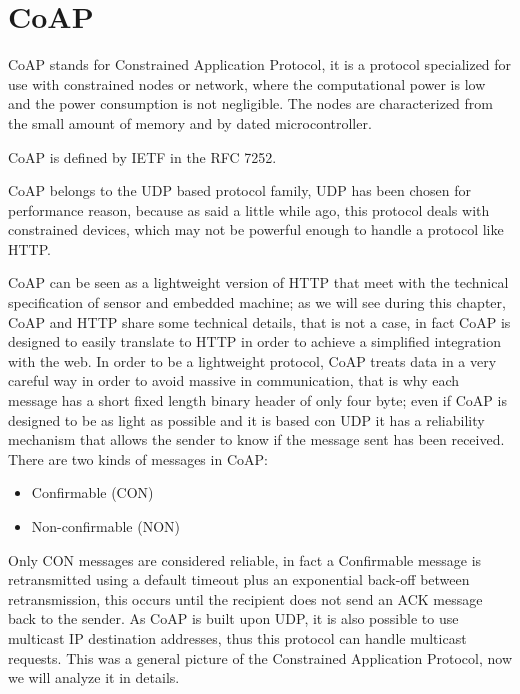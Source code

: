 
	\section{CoAP}
	CoAP stands for Constrained Application Protocol, it is a protocol specialized for use with constrained nodes or network, where the computational power is low and the power consumption is not negligible.\newline
	The nodes are characterized from the small amount of memory and by dated microcontroller.\newline
	
	CoAP is defined by IETF in the RFC 7252.\newline

	CoAP belongs to the UDP based protocol family, UDP has been chosen for performance reason, because as said a little while ago, this protocol deals with constrained devices, which may not be powerful enough to handle a protocol like HTTP.\newline
	
	CoAP can be seen as a lightweight version of HTTP that meet with the technical specification of sensor and embedded machine; as we will see during this chapter, CoAP and HTTP share some technical details, that is not a case, in fact CoAP is designed to easily translate to HTTP in order to achieve a simplified integration with the web.\newline
	\newline
	In order to be a lightweight protocol, CoAP treats data in a very careful way in order to avoid massive in communication, that is why each message has a short fixed length binary header of only four byte; even if CoAP is designed to be as light as possible and it is based con UDP it has a reliability mechanism that allows the sender to know if the message sent has been received.\newline
	\newline
	There are two kinds of messages in CoAP:
	\begin{itemize}
		\item Confirmable (CON)
		\item Non-confirmable (NON)
	\end{itemize}
	Only CON messages are considered reliable, in fact a Confirmable message is retransmitted using a default timeout plus an exponential back-off between retransmission, this occurs until the recipient does not send an ACK message back to the sender.\newline
	As CoAP is built upon UDP, it is also possible to use multicast IP destination addresses, thus this protocol can handle multicast requests.\newline
	This was a general picture of the Constrained Application Protocol, now we will analyze it in details.\newline
